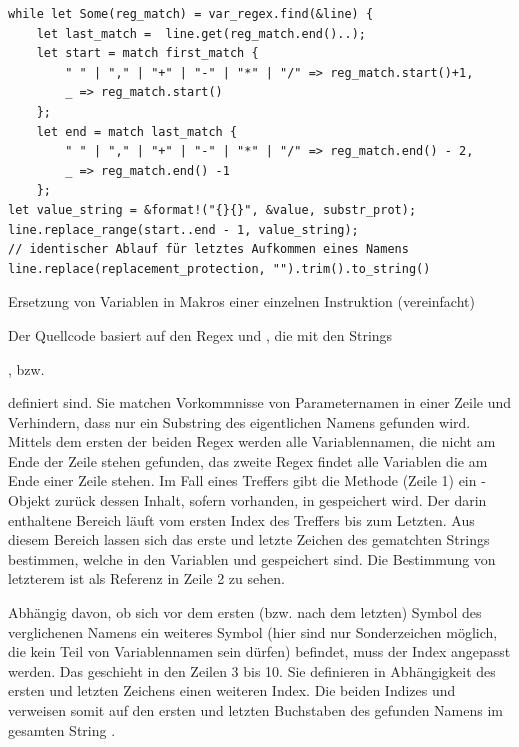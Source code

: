 \begin{listing}[th]
\begin{verbatim}
while let Some(reg_match) = var_regex.find(&line) {
    let last_match =  line.get(reg_match.end()..);
    let start = match first_match {
        " " | "," | "+" | "-" | "*" | "/" => reg_match.start()+1,
        _ => reg_match.start()
    };
    let end = match last_match {
        " " | "," | "+" | "-" | "*" | "/" => reg_match.end() - 2,
        _ => reg_match.end() -1
    };
let value_string = &format!("{}{}", &value, substr_prot);
line.replace_range(start..end - 1, value_string);
// identischer Ablauf für letztes Aufkommen eines Namens
line.replace(replacement_protection, "").trim().to_string()
\end{verbatim}
\label{lst:param-replace}
\caption{Ersetzung von Variablen in Makros einer einzelnen Instruktion (vereinfacht)}
\end{listing}

Der Quellcode basiert auf den Regex  und , die mit den Strings 

\qquad{}, bzw. 

\qquad{} 

definiert sind. Sie matchen Vorkommnisse von Parameternamen in einer Zeile und Verhindern, dass nur ein Substring des eigentlichen Namens gefunden wird. Mittels dem ersten der beiden Regex werden alle Variablennamen, die nicht am Ende der Zeile stehen gefunden, das zweite Regex findet alle Variablen die am Ende einer Zeile stehen. Im Fall eines Treffers gibt die Methode  (Zeile 1) ein -Objekt zurück dessen Inhalt, sofern vorhanden, in  gespeichert wird. Der darin enthaltene Bereich läuft vom ersten Index des Treffers bis zum Letzten. Aus diesem Bereich lassen sich das erste und letzte Zeichen des gematchten Strings bestimmen, welche in den Variablen  und  gespeichert sind. Die Bestimmung von letzterem ist als Referenz in Zeile 2 zu sehen.

Abhängig davon, ob sich vor dem ersten (bzw. nach dem letzten) Symbol des verglichenen Namens ein weiteres Symbol (hier sind nur Sonderzeichen möglich, die kein Teil von Variablennamen sein dürfen) befindet, muss der Index angepasst werden. Das geschieht in den Zeilen 3 bis 10. Sie definieren in Abhängigkeit des ersten und letzten Zeichens einen weiteren Index. Die beiden Indizes  und  verweisen somit auf den ersten und letzten Buchstaben des gefunden Namens im gesamten String .

